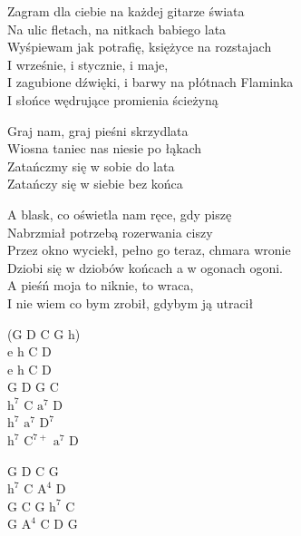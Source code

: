 
\begin{text}
    \chordfill
    Zagram dla ciebie na każdej gitarze świata\\
    Na ulic fletach, na nitkach babiego lata\\
    Wyśpiewam jak potrafię, księżyce na rozstajach\\
    I wrześnie, i stycznie, i maje,\\
    I zagubione dźwięki, i barwy na płótnach Flaminka\\
    I słońce wędrujące promienia ścieżyną

    \vin Graj nam, graj pieśni skrzydlata\\
    \vin Wiosna taniec nas niesie po łąkach\\
    \vin Zatańczmy się w sobie do lata\\
    \vin Zatańczy się w siebie bez końca

    A blask, co oświetla nam ręce, gdy piszę\\
    Nabrzmiał potrzebą rozerwania ciszy\\
    Przez okno wyciekł, pełno go teraz, chmara wronie\\
    Dziobi się w dziobów końcach a w ogonach ogoni.\\
    A pieśń moja to niknie, to wraca,\\
    I nie wiem co bym zrobił, gdybym ją utracił
\end{text}
\begin{chord}
    (G D C G h)\\
    e h C D\\
    e h C D\\
    G D G C\\
    $\mathrm{h^{7}}$ C $\mathrm{a^{7}}$ D\\
    $\mathrm{h^{7}}$ $\mathrm{a^{7}}$ $\mathrm{D^{7}}$\\
    $\mathrm{h^{7}}$ $\mathrm{C^{7+}}$ $\mathrm{a^{7}}$ D

    G D C G\\
    $\mathrm{h^{7}}$ C $\mathrm{A^{4}}$ D\\
    G C G $\mathrm{h^{7}}$ C\\
    G $\mathrm{A^{4}}$ C D G
\end{chord}
